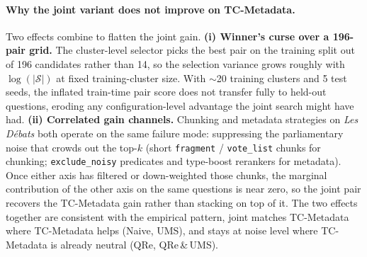 \paragraph{Why the joint variant does not improve on TC-Metadata.}
Two effects combine to flatten the joint gain.
\textbf{(i) Winner's curse over a 196-pair grid.} The cluster-level
selector picks the best pair on the training split out of 196
candidates rather than 14, so the selection variance grows roughly with
$\log(|\mathcal{S}|)$ at fixed training-cluster size. With $\sim$20
training clusters and 5 test seeds, the inflated train-time pair score
does not transfer fully to held-out questions, eroding any
configuration-level advantage the joint search might have had.
\textbf{(ii) Correlated gain channels.} Chunking and metadata strategies
on \textit{Les Débats} both operate on the same failure mode:
suppressing the parliamentary noise that crowds out the top-$k$
(short \texttt{fragment} / \texttt{vote\_list} chunks for chunking;
\texttt{exclude\_noisy} predicates and type-boost rerankers for
metadata). Once either axis has filtered or down-weighted those chunks,
the marginal contribution of the other axis on the same questions is
near zero, so the joint pair recovers the TC-Metadata gain rather than
stacking on top of it. The two effects together are consistent with the
empirical pattern, joint matches TC-Metadata where TC-Metadata helps
(Naive, UMS), and stays at noise level where TC-Metadata is already
neutral (QRe, QRe\,\&\,UMS).
